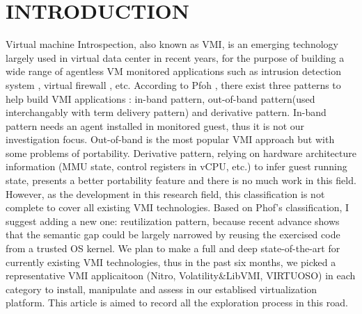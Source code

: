 
\chapter{INTRODUCTION} %

\label{Chapter1} %



Virtual machine Introspection, also known as VMI, is an emerging technology largely used in virtual data center in recent years, 
for the purpose of building a wide range of agentless VM monitored applications such as intrusion detection system \cite{Reference1}, 
virtual firewall \cite{Reference2}, etc. According to Pfoh \cite{Reference5}, there exist three patterns to help build VMI applications
: in-band pattern, out-of-band pattern(used interchangably with term delivery pattern) and derivative pattern. In-band pattern needs an
agent installed in monitored guest, thus it is not our investigation focus. Out-of-band is the most popular VMI approach but with some 
problems of portability. Derivative pattern, relying on hardware architecture information (MMU state, control registers in vCPU, etc.) 
to infer guest running state, presents a better portability feature and there is no much work in this field. However, as the development
in this research field, this classification is not complete to cover all existing VMI technologies. Based on Phof's classification,
I suggest adding a new one: reutilization pattern, because recent advance shows that the semantic gap could be largely narrowed by 
reusing the exercised code from a trusted OS kernel. We plan to make a full and deep state-of-the-art for currently existing VMI 
technologies, thus in the past six months, we picked a representative VMI applicaitoon (Nitro, Volatility\&LibVMI, VIRTUOSO) in each category to 
install, manipulate and assess in our establised virtualization platform. This article is aimed to record all the exploration process in this road.
